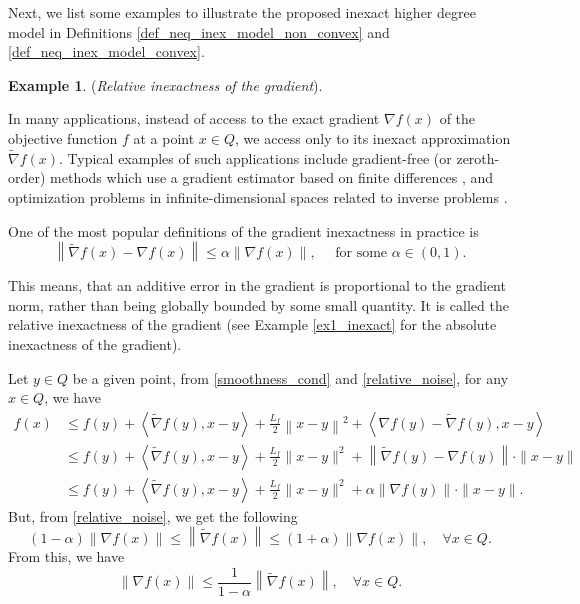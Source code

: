 \documentclass[11pt]{amsart}
\theoremstyle{definition}
\newtheorem{example}[theorem]{Example}
\numberwithin{equation}{section}
\begin{document}
Next, we list some examples to illustrate the proposed inexact higher degree model in Definitions \ref{def_neq_inex_model_non_convex} and \ref{def_neq_inex_model_convex}.  

\begin{example}\label{ex:relative_error} (\textit{Relative inexactness of the gradient}).

In many applications, instead of access to the exact gradient $\nabla f(x)$ of the objective function $f$ at a point $x \in Q$, we access only to its inexact approximation $\widetilde{\nabla} f(x)$. Typical examples of such applications include gradient-free (or zeroth-order) methods which use a gradient estimator based on finite differences \cite{Berahas2021theoretical,Conn2009Introduction,Risteski2016Algorithms}, and optimization problems in infinite-dimensional spaces related to inverse problems \cite{Kabanikhin2011,Gasnikov2017Hilbert}. 

One of the most popular definitions of the gradient inexactness in practice is  \cite{Polyak1987book}
\begin{equation}\label{relative_noise}
    \left\|\widetilde{\nabla} f(x) - \nabla f(x)\right\| \leq \alpha \|\nabla f(x)\|, \quad \text{ for some } \alpha \in (0, 1). 
\end{equation}

This means, that an additive error in the gradient is proportional to the gradient norm, rather than being globally bounded by some small quantity. It is called the relative inexactness of the gradient (see Example \ref{ex1_inexact} for the absolute inexactness of the gradient).

Let $y \in Q$ be a given point, from \eqref{smoothness_cond} and \eqref{relative_noise}, for any $ x \in Q$, we have 
\begin{align*}
    f(x) & \leq f(y) + \left\langle \widetilde{\nabla}   f(y), x - y \right\rangle + \frac{L_f}{2} \left\|x - y \right\|^2  + \left\langle \nabla f(y) - \widetilde{\nabla} f(y),  x  - y \right\rangle
    \\& \leq f(y) + \left\langle \widetilde{\nabla}  f(y), x - y  \right\rangle + \frac{L_f}{2} \|x -y \|^2  + \left\| \widetilde{\nabla} f(y) - \nabla f(y)\right\| \cdot  \| x  - y \|
    \\& \leq f(y) + \left\langle \widetilde{\nabla}  f(y), x - y  \right\rangle + \frac{L_f}{2} \|x - y \|^2 + \alpha \left\| \nabla f(y)\right\| \cdot \|  x - y \|.
\end{align*}
But, from \eqref{relative_noise}, we get the following
\begin{equation*}
    (1-\alpha) \left\|\nabla f(x)\right\| \leq \left\|\widetilde{\nabla} f(x)\right\|  \leq (1+\alpha) \left\|\nabla f(x)\right\|, \quad \forall x \in Q.
\end{equation*}
From this, we have 
\begin{equation*}
    \left\|\nabla f(x)\right\| \leq \frac{1}{1-\alpha} \left\|\widetilde{\nabla} f(x)\right\|, \quad \forall x \in Q.
\end{equation*}


\end{example}
\end{document}
